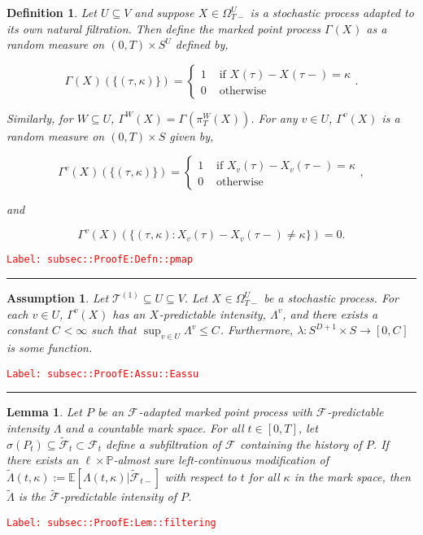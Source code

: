 \documentclass[12pt]{article}
\newcommand{\mb}{\mathbb}
\newcommand{\mc}{\mathcal}
\newcommand{\ra}{\rightarrow}
\newcommand{\te}{\text}
\newcommand{\tr}{\textcolor{red}}
\newcommand{\labe}[1]{\tr{\texttt{Label: #1}}}
\newcommand{\lin}{\rule{\linewidth}{0.4 pt}}
\newcommand{\pr}{\mb{P}}							%
\newcommand{\ex}[1]{\mb{E}\left[#1\right]}			%
\renewcommand{\v}{v}							%
\renewcommand{\U}{U}							%
\newcommand{\UU}{W}								%
\renewcommand{\S}{S}							%
\newcommand{\T}{T}								%
\renewcommand{\t}{t}							%
\newcommand{\sset}{\Omega}						%
\newcommand{\proj}{\pi}							%
\newcommand{\F}{\mc{F}}							%
\newcommand{\X}{X}								%
\newcommand{\vind}[1]{^{#1}}					%
\newcommand{\carp}[1]{^{#1}}					%
\newcommand{\vsi}[1]{^{#1}}						%
\newcommand{\cind}[1]{_{#1}}					%
\newcommand{\tp}[1]{(#1)}						%
\newcommand{\tip}[1]{#1}						%
\newcommand{\ts}[1]{_{#1}}						%
\newcommand{\const}{C}							%
\newcommand{\degr}{D}							%
\newcommand{\tree}{\mc{T}}						%
\newcommand{\sln}[1]{^{(#1)}}					%
\newcommand{\Sm}{\ell}							%
\newcommand{\alt}[1]{\widetilde{#1}}			%
\newcommand{\indx}[1]{_{#1}}					%
\newcommand{\rt}{\tau}							%
\newcommand{\pmap}{\Gamma}						%
\renewcommand{\mark}{\kappa}					%
\newcommand{\rp}{P}								%
\newcommand{\ratee}{\Lambda}					%
\newcommand{\cratee}{\alt{\Lambda}} 			%
\newtheorem{lem}[thms]{Lemma}
\newtheorem{defn}[thms]{Definition}
\newtheorem{assu}[thms]{Assumption}
\begin{document}
\begin{defn}
Let \(\U\subseteq V\) and suppose \(\X\cind{}\tip{} \in \sset\vsi{\U}\ts{\T-}\) is a stochastic process adapted to its own natural filtration. Then define the marked point process \(\pmap\vind{}(\X\cind{}\tip{})\) as a random measure on \((0,\T) \times \S\carp{\U}\) defined by,

\[\pmap\vind{}(\X\cind{}\tip{})(\{(\rt\indx{},\mark{})\}) = \begin{cases}
1 &\te{ if } \X\cind{}\tp{\rt\indx{}} - \X\cind{}\tp{\rt\indx{}-} = \mark{}\\
0 &\te{ otherwise}
\end{cases}.\]

Similarly, for \(\UU \subseteq \U\), \(\pmap\vind{\UU}(\X\cind{}\tip{}) = \pmap\vind{}\left(\proj\vsi{\UU}\ts{\T}(\X\cind{}\tip{})\right)\). For any \(\v\in \U\), \(\pmap\vind{\v}(\X\cind{}\tip{})\) is a random measure on \((0,\T) \times \S\) given by,

\[\pmap\vind{\v}(\X\cind{}\tip{})(\{(\rt\indx{},\mark{})\}) = \begin{cases}
1 &\te{ if } \X\cind{\v}\tp{\rt\indx{}} - \X\cind{\v}\tp{\rt\indx{}-} = \mark{}\\
0 &\te{ otherwise}
\end{cases},\]

and

\[\pmap\vind{\v}(\X\cind{}\tip{})(\{(\rt\indx{},\mark{}): \X\cind{\v}\tp{\rt\indx{}} - \X\cind{\v}\tp{\rt\indx{}-} \neq \mark{}\}) = 0.\]
\label{subsec::ProofE:Defn::pmap}
\end{defn}
\labe{subsec::ProofE:Defn::pmap}

\lin

\begin{assu}
Let \(\tree\sln{1}\subseteq\U \subseteq V\). Let \(\X\cind{}\tip{}\in \sset\vsi{\U}\ts{\T-}\) be a stochastic process. For each \(\v\in \U\), \(\pmap\vind{\v}(\X\cind{}\tip{})\) has an \(\X\cind{}\tip{}\)-predictable intensity, \(\ratee\vind{\v}\), and there exists a constant \(\const\indx{} < \infty\) such that \(\sup_{\v\in\U} \ratee\vind{\v} \leq \const\indx{}\). Furthermore, \(\lambda: \S\carp{\degr+1}\times \S\ra[0,\const\indx{}]\) is some function.
\label{subsec::ProofE:Assu::Eassu}
\end{assu}
\labe{subsec::ProofE:Assu::Eassu}

\lin

\begin{lem}
Let \(\rp\) be an \(\F\vsi{}\ts{}\)-adapted marked point process with \(\F\vsi{}\ts{}\)-predictable intensity \(\ratee\) and a countable mark space. For all \(\t \in [0,\T]\), let \(\sigma(\rp\ts{\t}) \subseteq \alt{\F}\ts{\t}\subset \F\vsi{}\ts{\t}\) define a subfiltration of \(\F\vsi{}\ts{}\) containing the history of \(\rp\). If there exists an \(\Sm\times \pr\)-almost sure left-continuous modification of \(\cratee{}{}(\t,\mark{}) := \ex{\ratee(\t,\mark{})|\alt{\F}\ts{\t-}}\) with respect to \(\t\) for all \(\mark{}\) in the mark space, then \(\cratee{}{}\) is the \(\alt{\F}\)-predictable intensity of \(\rp\).
\label{subsec::ProofE:Lem::filtering}
\end{lem}
\labe{subsec::ProofE:Lem::filtering}
\end{document}
